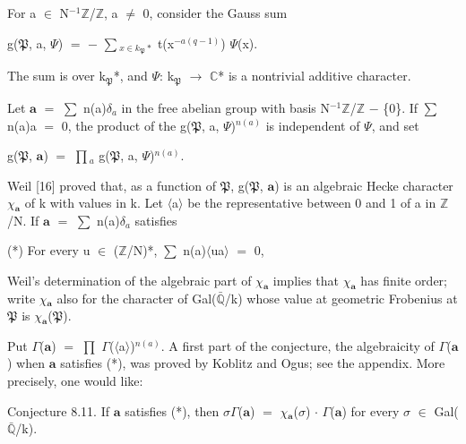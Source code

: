\documentclass[10pt,twoside]{article}
\begin{document}
For a \ensuremath{∈} N\ensuremath{^{-1}}\ensuremath{ℤ}/\ensuremath{ℤ}, a \ensuremath{≠} 0, consider the Gauss sum\par
g(\ensuremath{𝔓}, a, \ensuremath{Ψ}) \ensuremath{=} \ensuremath{−} \ensuremath{∑}\ensuremath{_{x∈k_𝔓*}} t(x\ensuremath{^{−a(q−1)}}) \ensuremath{Ψ}(x).\par
The sum is over k\ensuremath{_{𝔓}}*, and \ensuremath{Ψ}: k\ensuremath{_{𝔓}} \ensuremath{→} \ensuremath{ℂ}* is a nontrivial additive character.\par
Let \ensuremath{𝐚} \ensuremath{=} \ensuremath{∑} n(a)\ensuremath{δ}\ensuremath{_{a}} in the free abelian group with basis N\ensuremath{^{-1}}\ensuremath{ℤ}/\ensuremath{ℤ} \ensuremath{−} \{0\}. If \ensuremath{∑} n(a)a \ensuremath{=} 0, the product of the g(\ensuremath{𝔓}, a, \ensuremath{Ψ})\ensuremath{^{n(a)}} is independent of \ensuremath{Ψ}, and set\par
g(\ensuremath{𝔓}, \ensuremath{𝐚}) \ensuremath{=} \ensuremath{∏}\ensuremath{_{a}} g(\ensuremath{𝔓}, a, \ensuremath{Ψ})\ensuremath{^{n(a)}}.\par
Weil [16] proved that, as a function of \ensuremath{𝔓}, g(\ensuremath{𝔓}, \ensuremath{𝐚}) is an algebraic Hecke character \ensuremath{χ}\ensuremath{_{𝐚}} of k with values in k. Let \ensuremath{⟨}a\ensuremath{⟩} be the representative between 0 and 1 of a in \ensuremath{ℤ}/N. If \ensuremath{𝐚} \ensuremath{=} \ensuremath{∑} n(a)\ensuremath{δ}\ensuremath{_{a}} satisfies\par
(*)    For every u \ensuremath{∈} (\ensuremath{ℤ}/N)*, \ensuremath{∑} n(a)\ensuremath{⟨}ua\ensuremath{⟩} \ensuremath{=} 0,\par
Weil’s determination of the algebraic part of \ensuremath{χ}\ensuremath{_{𝐚}} implies that \ensuremath{χ}\ensuremath{_{𝐚}} has finite order; write \ensuremath{χ}\ensuremath{_{𝐚}} also for the character of Gal(\ensuremath{\bar{ℚ}}/k) whose value at geometric Frobenius at \ensuremath{𝔓} is \ensuremath{χ}\ensuremath{_{𝐚}}(\ensuremath{𝔓}).\par
Put \ensuremath{Γ}(\ensuremath{𝐚}) \ensuremath{=} \ensuremath{∏} \ensuremath{Γ}(\ensuremath{⟨}a\ensuremath{⟩})\ensuremath{^{n(a)}}. A first part of the conjecture, the algebraicity of \ensuremath{Γ}(\ensuremath{𝐚}) when \ensuremath{𝐚} satisfies (*), was proved by Koblitz and Ogus; see the appendix. More precisely, one would like:\par
Conjecture 8.11. If \ensuremath{𝐚} satisfies (*), then \ensuremath{σ}\ensuremath{Γ}(\ensuremath{𝐚}) \ensuremath{=} \ensuremath{χ}\ensuremath{_{𝐚}}(\ensuremath{σ}) \ensuremath{·} \ensuremath{Γ}(\ensuremath{𝐚}) for every \ensuremath{σ} \ensuremath{∈} Gal(\ensuremath{\bar{ℚ}}/k).\par
\end{document}
